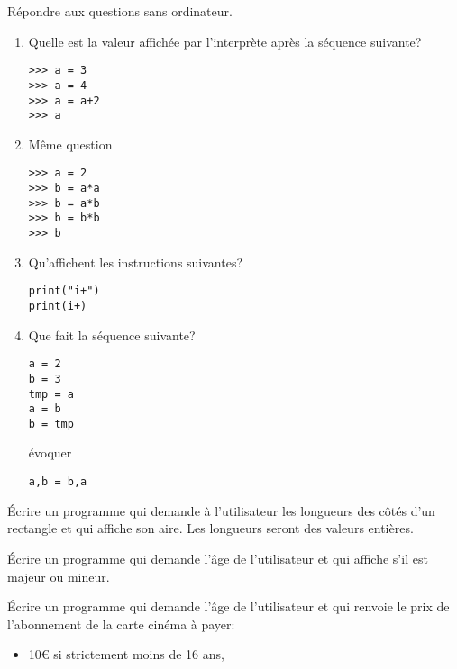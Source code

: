 \documentclass[a4paper,11pt]{article}
\begin{document}
\begin{Form}
\begin{exo}
Répondre aux questions sans ordinateur.
\begin{enumerate}
\item Quelle est la valeur affichée par l'interprète après la séquence suivante?
\begin{lstlisting}
>>> a = 3
>>> a = 4
>>> a = a+2
>>> a
\end{lstlisting}
\item Même question
\begin{lstlisting}
>>> a = 2
>>> b = a*a
>>> b = a*b
>>> b = b*b
>>> b
\end{lstlisting}
\item Qu'affichent les instructions suivantes?
\begin{lstlisting}
print("i+")
print(i+)
\end{lstlisting}
\item Que fait la séquence suivante?
\begin{lstlisting}
a = 2
b = 3
tmp = a
a = b
b = tmp
\end{lstlisting}
\begin{commentprof}
évoquer
\begin{lstlisting}
a,b = b,a
\end{lstlisting}
\end{commentprof}
\end{enumerate}
\end{exo}
\begin{center}
\end{center}
\begin{exo}
Écrire un programme qui demande à l'utilisateur les longueurs des côtés d'un rectangle et qui affiche son aire. Les longueurs seront des valeurs entières.
\end{exo}
\begin{exo}
Écrire un programme qui demande l'âge de l'utilisateur et qui affiche s'il est majeur ou mineur.
\end{exo}
\begin{exo}
Écrire un programme qui demande l'âge de l'utilisateur et qui renvoie le prix de l'abonnement de la carte cinéma à payer:
\begin{itemize}
\item 10€ si strictement moins de 16 ans,

\end{itemize}
\end{exo}
\end{Form}
\end{document}
